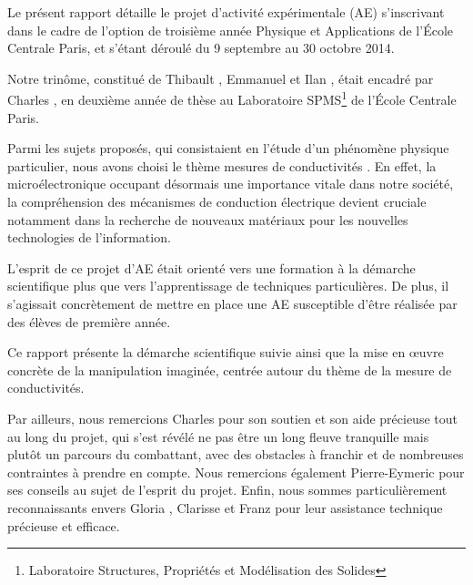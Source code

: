 Le présent rapport détaille le projet d'activité expérimentale (AE) s'inscrivant dans le cadre de l'option de troisième année 
\og Physique et Applications \fg{} de l'École Centrale Paris, et s'étant déroulé du 9 septembre au 30 octobre 2014.

\bigskip
Notre trinôme, constitué de Thibault , Emmanuel  et Ilan , était encadré 
par Charles , en deuxième année de thèse au Laboratoire SPMS\footnote{Laboratoire Structures, 
Propriétés et Modélisation des Solides} de l'École Centrale Paris.

\bigskip
Parmi les sujets proposés, qui consistaient en l'étude d'un phénomène physique particulier, nous avons choisi le thème 
\og mesures de conductivités \fg. En effet, la microélectronique occupant désormais une importance vitale dans notre société, 
la compréhension des mécanismes de conduction électrique devient cruciale notamment dans 
la recherche de nouveaux matériaux pour les nouvelles technologies de l'information.

\bigskip
L'esprit de ce projet d'AE était orienté vers une formation à la démarche scientifique plus que vers l'apprentissage
de techniques particulières. De plus, il s'agissait concrètement de mettre en place une AE susceptible d'être réalisée
par des élèves de première année.

\bigskip
Ce rapport présente la démarche scientifique suivie ainsi que la mise en \oe uvre concrète de la manipulation
imaginée, centrée autour du thème de la mesure de conductivités.

\bigskip
Par ailleurs, nous remercions Charles  pour son soutien et son aide précieuse tout au long du projet, 
qui s'est révélé ne pas être un long fleuve tranquille mais plutôt un parcours du combattant, avec des obstacles à
franchir et de nombreuses contraintes à prendre en compte. 
Nous remercions également Pierre-Eymeric  pour ses conseils au sujet de l'esprit du projet. 
Enfin, nous sommes particulièrement reconnaissants envers Gloria , Clarisse  et Franz 
 pour leur assistance technique précieuse et efficace.

